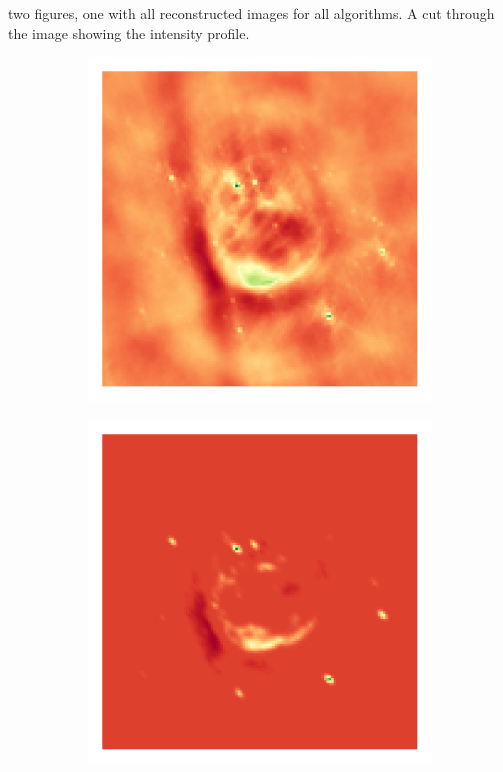 two figures, one with all reconstructed images for all algorithms. A cut through the image showing the intensity profile.

\begin{figure}[h]
	\centering
	\begin{subfigure}[b]{0.24\linewidth}
		\includegraphics[width=\linewidth, trim={18px 19px 18px 18px}, clip]{./chapters/05.results/g55/raw_model.png}
	\end{subfigure}
	\begin{subfigure}[b]{0.24\linewidth}
		\includegraphics[width=\linewidth, trim={18px 19px 18px 18px}, clip]{./chapters/05.results/g55/clean_model.png}

\end{subfigure}
\end{figure}
